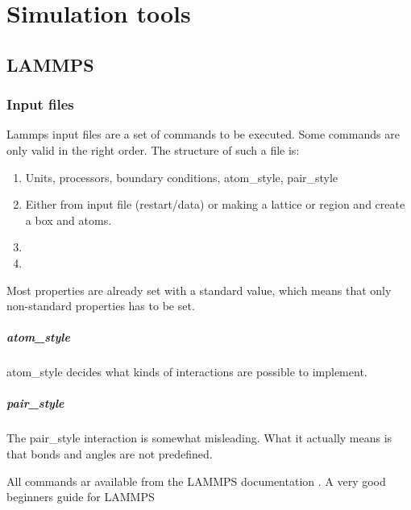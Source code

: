 \chapter{Simulation tools}

\section{LAMMPS}

\subsection{Input files}
Lammps input files are a set of commands to be executed. Some commands are only valid in the right order. The structure of such a file is:

\begin{enumerate}
\item {} Units, processors, boundary conditions, atom\_style, pair\_style
\item {} Either from input file (restart/data) or making a lattice or region and create a box and atoms. 
\item {} 
\item {}	
\end{enumerate}

Most properties are already set with a standard value, which means that only non-standard properties has to be set. 

\paragraph{atom\_style}
atom\_style decides what kinds of interactions are possible to implement.

\paragraph{pair\_style}
The pair\_style interaction is somewhat misleading. What it actually means is that bonds and angles are not predefined. 

All commands ar available from the LAMMPS documentation \cite{lammps:input_commands}. A very good beginners guide for LAMMPS \cite{lammps:guide:pittsburg}